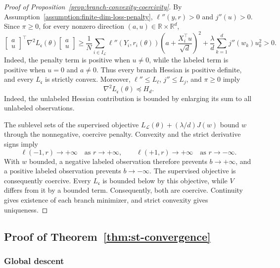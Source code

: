 \begin{proof}[Proof of Proposition~\ref{prop:branch-convexity-coercivity}]
By Assumption~\ref{assumption:finite-dim-loss-penalty},
$\ell''(y,r)>0$ and $j''(u)>0$.
Since $\pi\geq0$, for every nonzero direction
$(a,u)\in\mathbb R\times\mathbb R^d$,
\[
    \begin{bmatrix}a\\u\end{bmatrix}^{\!\top}
    \nabla^2L_{\mathfrak c}(\theta)
    \begin{bmatrix}a\\u\end{bmatrix}
    \geq
    \frac1N\sum_{i\in I_{\mathcal L}}
        \ell''(Y_i,r_i(\theta))
        \left(a+\frac{X_i^\top u}{\sqrt d}\right)^2
    +
    \frac{\lambda}{d}\sum_{k=1}^d j''(w_k)u_k^2
    >0.
\]
Indeed, the penalty term is positive when $u\neq0$, while the
labeled term is positive when $u=0$ and $a\neq0$.
Thus every branch Hessian is positive definite, and every
$L_{\mathfrak c}$ is strictly convex.
Moreover, $\ell''\leq L_\ell$, $j''\leq L_j$, and $\pi\geq0$
imply
\[
    \nabla^2L_{\mathfrak c}(\theta)\preceq H_d.
\]
Indeed, the unlabeled Hessian contribution is bounded by
enlarging its sum to all unlabeled observations.

The sublevel sets of the supervised objective
$L_{\mathcal L}(\theta)+(\lambda/d)J(w)$ bound $w$
through the nonnegative, coercive penalty.
Convexity and the strict derivative signs imply
\[
    \ell(-1,r)\longrightarrow+\infty
        \quad\text{as }r\longrightarrow+\infty,
    \qquad
    \ell(+1,r)\longrightarrow+\infty
        \quad\text{as }r\longrightarrow-\infty.
\]
With $w$ bounded, a negative labeled observation therefore prevents
$b\to+\infty$, and a positive labeled observation prevents
$b\to-\infty$.
The supervised objective is consequently coercive.
Every $L_{\mathfrak c}$ is bounded below by this objective,
while $V$ differs from it by a bounded term.
Consequently, both are coercive.
Continuity gives existence of each branch minimizer, and
strict convexity gives uniqueness.
\end{proof}

\subsection{Proof of Theorem~\ref{thm:st-convergence}}

\subsubsection{Global descent}
\label{subsec:global-descent}

